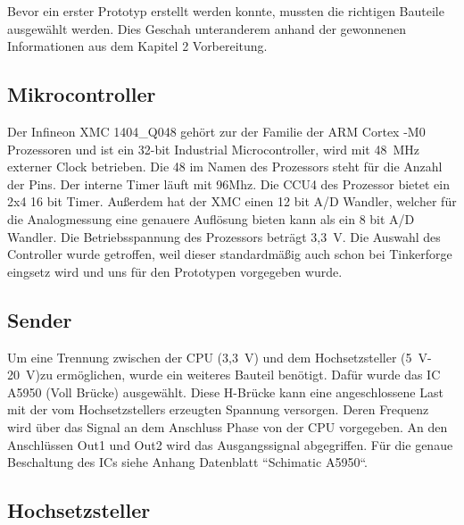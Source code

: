 Bevor ein erster Prototyp erstellt werden konnte, mussten die richtigen Bauteile ausgewählt werden. Dies Geschah unteranderem anhand der gewonnenen Informationen aus dem Kapitel 2 Vorbereitung. 

\subsection{Mikrocontroller}
Der Infineon XMC 1404\_Q048 gehört zur der Familie der ARM Cortex -M0 Prozessoren und ist ein 32-bit Industrial Microcontroller, wird mit 48~MHz externer Clock betrieben. Die 48 im Namen des Prozessors steht für die Anzahl der Pins. Der interne Timer läuft mit 96Mhz. Die CCU4 des Prozessor bietet ein 2x4 16 bit Timer. Außerdem hat der XMC einen 12 bit A/D Wandler, welcher für die Analogmessung eine genauere Auflösung bieten kann als ein 8 bit A/D Wandler. Die Betriebsspannung des Prozessors beträgt 3,3~V. Die Auswahl des Controller wurde getroffen, weil dieser standardmäßig auch schon bei Tinkerforge eingsetz wird und uns für den Prototypen vorgegeben wurde. 


\subsection{Sender}
Um eine Trennung zwischen der CPU (3,3~V) und dem Hochsetzsteller (5~V-20~V)zu ermöglichen, wurde ein weiteres Bauteil benötigt. Dafür wurde das IC A5950 (Voll Brücke) ausgewählt. Diese H-Brücke kann eine angeschlossene Last mit der vom Hochsetzstellers erzeugten Spannung versorgen. Deren Frequenz wird über das Signal an dem Anschluss Phase von der CPU vorgegeben. An den Anschlüssen Out1 und Out2 wird das Ausgangssignal abgegriffen. Für die genaue Beschaltung des ICs siehe Anhang Datenblatt “Schimatic A5950“.


\subsection{Hochsetzsteller}

